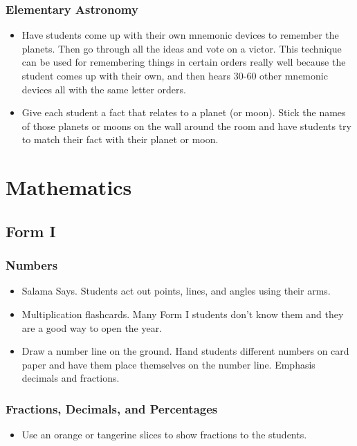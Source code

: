  \subsubsection{Elementary Astronomy}
\begin{itemize}
\item	Have students come up with their own mnemonic devices to remember the planets. Then go through all the ideas and vote on a victor. This technique can be used for remembering things in certain orders really well because the student comes up with their own, and then hears 30-60 other mnemonic devices all with the same letter orders. 
\item	Give each student a fact that relates to a planet (or moon). Stick the names of those planets or moons on the wall around the room and have students try to match their fact with their planet or moon. 
\end{itemize}

\section{Mathematics}
\subsection{Form I}
\subsubsection{Numbers}
\begin{itemize}
\item	Salama Says. Students act out points, lines, and angles using their arms.  
\item	Multiplication flashcards. Many Form I students don't know them and they are a good way to open the year.  
\item	Draw a number line on the ground.  Hand students different numbers on card paper and have them place themselves on the number line.  Emphasis decimals and fractions.
\end{itemize}

\subsubsection{Fractions, Decimals, and Percentages}
\begin{itemize}
\item  Use an orange or tangerine slices to show fractions to the students.
\end{itemize}

